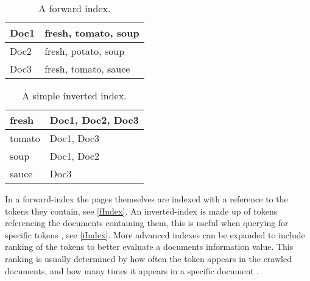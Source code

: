 \begin{minipage}{.40\textwidth}
  \centering
  \begin{table}[H]
	\centering
    \begin{tabular}{|l|l|}
\hline
Doc1 & fresh, tomato, soup \\ \hline
Doc2 & fresh, potato, soup \\ \hline
Doc3 & fresh, tomato, sauce \\ \hline
	\end{tabular}
	\caption{A forward index.}
	\label{fIndex}
  \end{table}
\end{minipage}
\begin{minipage}{0.5\textwidth}
  \centering
  \begin{table}[H]
	\centering
    \begin{tabular}{|l|l|}
\hline
fresh & Doc1, Doc2, Doc3 \\ \hline
tomato & Doc1, Doc3 \\ \hline
soup & Doc1, Doc2 \\ \hline
sauce & Doc3 \\ \hline
	\end{tabular}
	\caption{A simple inverted index.}
	\label{iIndex}
  \end{table}
\end{minipage}\nl

In a forward-index the pages themselves are indexed with a reference to the
tokens they contain, see \autoref{fIndex}. An inverted-index is made up of
tokens referencing the documents containing them, this is useful when
querying for specific tokens \citep{Index3}, see \autoref{iIndex}. More advanced
indexes can be expanded to include ranking of the tokens to better
evaluate a documents information value. This ranking is usually determined by
how often the token appears in the crawled documents, and how many times it
appears in a specific document \Source.




